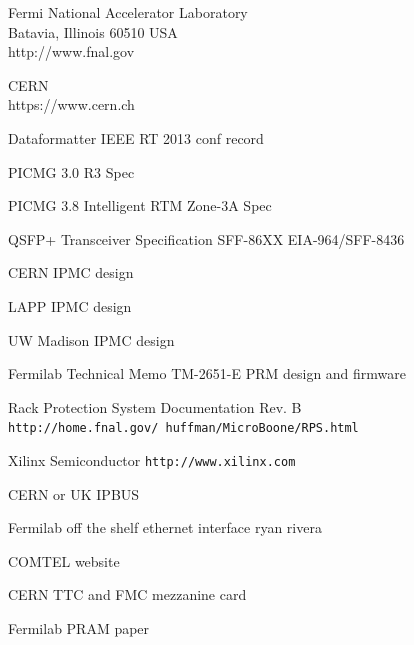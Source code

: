 \documentclass[letterpaper]{article}
\begin{document}
\newpage
\begin{thebibliography}{77}
\small

 Fermi National Accelerator Laboratory\\
Batavia, Illinois 60510 USA\\
http://www.fnal.gov

 CERN\\
https://www.cern.ch


 Dataformatter IEEE RT 2013 conf record

 PICMG 3.0 R3 Spec

 PICMG 3.8 Intelligent RTM Zone-3A Spec

 QSFP+ Transceiver Specification SFF-86XX  EIA-964/SFF-8436

 CERN IPMC design

 LAPP IPMC design

 UW Madison IPMC design

 Fermilab Technical Memo TM-2651-E PRM design and firmware

 Rack Protection System Documentation Rev. B \texttt{http://home.fnal.gov/~huffman/MicroBoone/RPS.html}

 Xilinx Semiconductor \texttt{http://www.xilinx.com}

 CERN or UK IPBUS

 Fermilab off the shelf ethernet interface ryan rivera

 COMTEL website

 CERN TTC and FMC mezzanine card

 Fermilab PRAM paper

\end{thebibliography}
\end{document}
